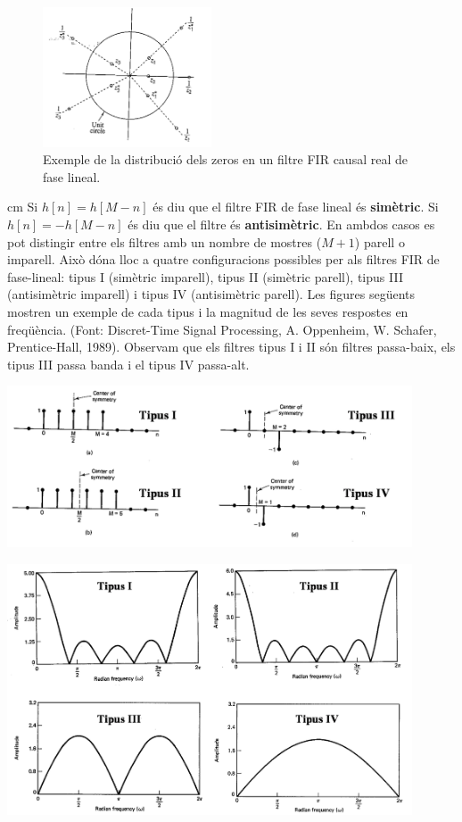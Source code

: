 \documentclass{article}
\begin{document}
\begin{figure}[htbp]
\begin{center}
\includegraphics[width=5cm]{zerosFIRlineal.png}
\end{center}
\caption{Exemple de la distribució dels zeros en un filtre FIR causal real de fase lineal.}
\label{zerosFIRlineal}
\end{figure}

 cm
Si $h[n]=h[M-n]$ és diu que el filtre FIR de fase lineal és \textbf{simètric}.
Si $h[n]=-h[M-n]$ és diu que el filtre és \textbf{antisimètric}. En ambdos casos es pot distingir
entre els filtres amb un nombre de mostres ($M+1$) parell o imparell. Això dóna lloc
a quatre configuracions possibles per als filtres FIR de fase-lineal:
tipus I (simètric imparell), tipus II (simètric parell), tipus III (antisimètric imparell)
i tipus IV (antisimètric parell). Les figures següents mostren un exemple de cada tipus
i la magnitud de les seves respostes en freqüència. (Font: Discret-Time Signal
Processing, A. Oppenheim, W. Schafer, Prentice-Hall, 1989).
Observam que els filtres tipus I i II són filtres passa-baix, els tipus III passa banda 
i el tipus IV passa-alt.


\begin{center}
\includegraphics[width=12cm]{tipusFIR.png}
\end{center}

\begin{center}
\includegraphics[width=12cm]{tipusFIR_H.png}
\end{center}
\end{document}
